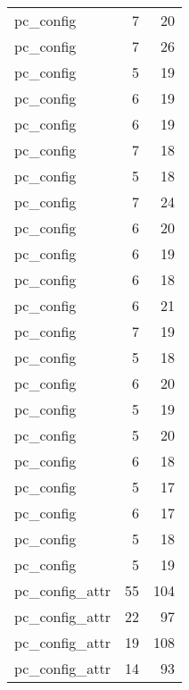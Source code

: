 \begin{table}
\begin{tabular}{lrr}
                       pc\_config &         7 &        20 \\
                       pc\_config &         7 &        26 \\
                       pc\_config &         5 &        19 \\
                       pc\_config &         6 &        19 \\
                       pc\_config &         6 &        19 \\
                       pc\_config &         7 &        18 \\
                       pc\_config &         5 &        18 \\
                       pc\_config &         7 &        24 \\
                       pc\_config &         6 &        20 \\
                       pc\_config &         6 &        19 \\
                       pc\_config &         6 &        18 \\
                       pc\_config &         6 &        21 \\
                       pc\_config &         7 &        19 \\
                       pc\_config &         5 &        18 \\
                       pc\_config &         6 &        20 \\
                       pc\_config &         5 &        19 \\
                       pc\_config &         5 &        20 \\
                       pc\_config &         6 &        18 \\
                       pc\_config &         5 &        17 \\
                       pc\_config &         6 &        17 \\
                       pc\_config &         5 &        18 \\
                       pc\_config &         5 &        19 \\
                  pc\_config\_attr &        55 &       104 \\
                  pc\_config\_attr &        22 &        97 \\
                  pc\_config\_attr &        19 &       108 \\
                  pc\_config\_attr &        14 &        93 \\

\end{tabular}
\end{table}
